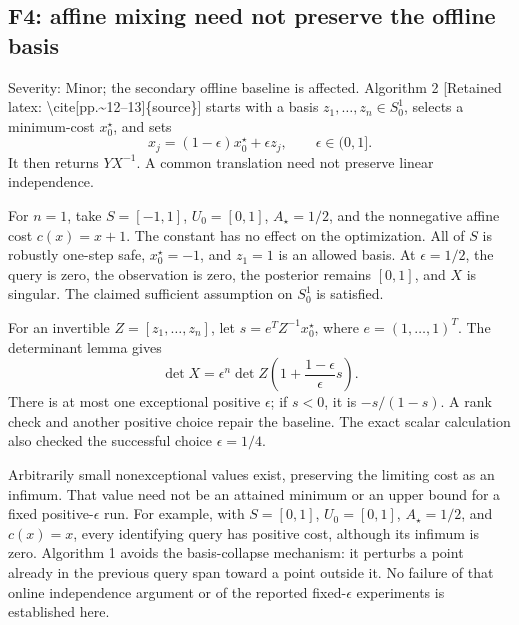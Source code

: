 \documentclass[10pt]{article}
\begin{document}
\subsection*{F4: affine mixing need not preserve the offline basis}
Severity: Minor; the secondary offline baseline is affected. Algorithm 2 [Retained latex: \textbackslash{}cite[pp.\textasciitilde{}12--13]\{source\}] starts with a basis \(z_1,\ldots,z_n\in S_0^1\), selects a minimum-cost \(x_0^\star\), and sets \[x_j=(1-\epsilon)x_0^\star+\epsilon z_j,\qquad
 \epsilon\in(0,1].\] It then returns \(YX^{-1}\). A common translation need not preserve linear independence.\par
For \(n=1\), take \(S=[-1,1]\), \(U_0=[0,1]\), \(A_\star=1/2\), and the nonnegative affine cost \(c(x)=x+1\). The constant has no effect on the optimization. All of \(S\) is robustly one-step safe, \(x_0^\star=-1\), and \(z_1=1\) is an allowed basis. At \(\epsilon=1/2\), the query is zero, the observation is zero, the posterior remains \([0,1]\), and \(X\) is singular. The claimed sufficient assumption on \(S_0^1\) is satisfied.\par
For an invertible \(Z=[z_1,\ldots,z_n]\), let \(s=e^TZ^{-1}x_0^\star\), where \(e=(1,\ldots,1)^T\). The determinant lemma gives \[\det X=\epsilon^n\det Z
       \left(1+\frac{1-\epsilon}{\epsilon}s\right).\] There is at most one exceptional positive \(\epsilon\); if \(s<0\), it is \(-s/(1-s)\). A rank check and another positive choice repair the baseline. The exact scalar calculation also checked the successful choice \(\epsilon=1/4\).\par
Arbitrarily small nonexceptional values exist, preserving the limiting cost as an infimum. That value need not be an attained minimum or an upper bound for a fixed positive-\(\epsilon\) run. For example, with \(S=[0,1]\), \(U_0=[0,1]\), \(A_\star=1/2\), and \(c(x)=x\), every identifying query has positive cost, although its infimum is zero. Algorithm 1 avoids the basis-collapse mechanism: it perturbs a point already in the previous query span toward a point outside it. No failure of that online independence argument or of the reported fixed-\(\epsilon\) experiments is established here.\par
\end{document}
